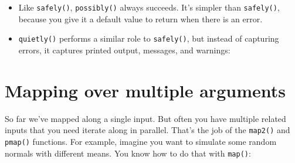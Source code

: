 \documentclass[]{book}
\newenvironment{Shaded}{\begin{snugshade}}{\end{snugshade}}
\newcommand{\KeywordTok}[1]{\textcolor[rgb]{0.13,0.29,0.53}{\textbf{{#1}}}}
\newcommand{\DecValTok}[1]{\textcolor[rgb]{0.00,0.00,0.81}{{#1}}}
\newcommand{\StringTok}[1]{\textcolor[rgb]{0.31,0.60,0.02}{{#1}}}
\newcommand{\CommentTok}[1]{\textcolor[rgb]{0.56,0.35,0.01}{\textit{{#1}}}}
\newcommand{\OtherTok}[1]{\textcolor[rgb]{0.56,0.35,0.01}{{#1}}}
\newcommand{\NormalTok}[1]{{#1}}
\begin{document}
\begin{itemize}
\item
  Like \texttt{safely()}, \texttt{possibly()} always succeeds. It's
  simpler than \texttt{safely()}, because you give it a default value to
  return when there is an error.

\begin{Shaded}
\end{Shaded}
\item
  \texttt{quietly()} performs a similar role to \texttt{safely()}, but
  instead of capturing errors, it captures printed output, messages, and
  warnings:

\begin{Shaded}
\end{Shaded}
\end{itemize}

\section{Mapping over multiple
arguments}\label{mapping-over-multiple-arguments}

So far we've mapped along a single input. But often you have multiple
related inputs that you need iterate along in parallel. That's the job
of the \texttt{map2()} and \texttt{pmap()} functions. For example,
imagine you want to simulate some random normals with different means.
You know how to do that with \texttt{map()}:
\end{document}
